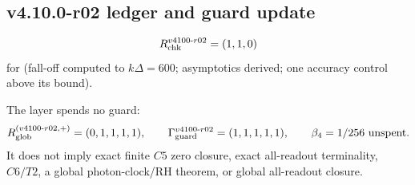 \subsection*{v4.10.0-r02 ledger and guard update}
\label{subsec:v4100-r02-ledger-guard}

\[
R_{\rm chk}^{v4100\text{-}r02}=(1,1,0)
\]
for (fall-off computed to \(k\Delta=600\); asymptotics derived; one accuracy control above its bound).

The layer spends no guard:
\[
R_{\rm glob}^{(v4100\text{-}r02,+)}=(0,1,1,1,1),
\qquad
\Gamma_{\rm guard}^{v4100\text{-}r02}=(1,1,1,1,1),
\qquad
\beta_4=1/256\ \text{unspent}.
\]
It does not imply exact finite \(C5\) zero closure, exact all-readout terminality,
\(C6/T2\), a global photon-clock/RH theorem, or global all-readout closure.
